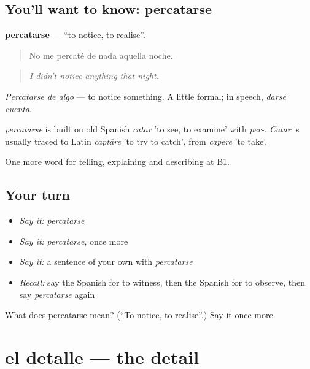 \subsection*{You'll want to know: percatarse}
\textbf{percatarse} — \textquotedblleft{}to notice, to realise\textquotedblright{}.

\begin{quote}
No me percaté de nada aquella noche.
\end{quote}

\begin{quote}
\emph{I didn't notice anything that night.}
\end{quote}

\emph{Percatarse de algo} — to notice something. A little formal; in speech, \emph{darse cuenta}.

\begin{cousinweb}
\emph{percatarse} is built on old Spanish \emph{catar} 'to see, to examine' with \emph{per-}. \emph{Catar} is usually traced to Latin \emph{captāre} 'to try to catch', from \emph{capere} 'to take'.
\end{cousinweb}

\begin{grammarlens}[title={What you've built}]
One more word for telling, explaining and describing at B1.
\end{grammarlens}

\subsection*{Your turn}
\begin{itemize}
\raggedright
  \item \emph{Say it:} \emph{percatarse}
  \item \emph{Say it:} \emph{percatarse}, once more
  \item \emph{Say it:} a sentence of your own with \emph{percatarse}
  \item \emph{Recall:} say the Spanish for to witness, then the Spanish for to observe, then say \emph{percatarse} again
\end{itemize}

\begin{tcolorbox}[breakable,colback=teal!4,colframe=teal!35!black,title={Before you move on}]
What does percatarse mean? (\textquotedblleft{}To notice, to realise\textquotedblright{}.) Say it once more.
\end{tcolorbox}
\section[el detalle]{el detalle — the detail}

